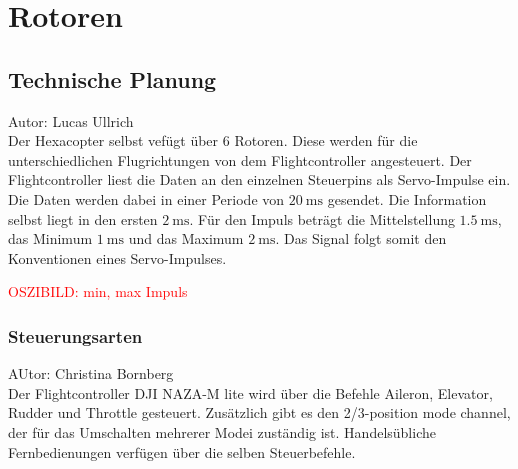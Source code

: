 \section{Rotoren}

  \subsection{Technische Planung}
  Autor: Lucas Ullrich\\
  Der Hexacopter selbst vefügt über 6 Rotoren. Diese werden für die unterschiedlichen Flugrichtungen von dem Flightcontroller angesteuert.
  Der Flightcontroller liest die Daten an den einzelnen Steuerpins als Servo-Impulse ein. Die Daten werden dabei in einer Periode von $\SI{20}{\milli\second}$ gesendet.
  Die Information selbst liegt in den ersten $\SI{2}{\milli\second}$. Für den Impuls beträgt die Mittelstellung $\SI{1.5}{\milli\second}$, das Minimum $\SI{1}{\milli\second}$
  und das Maximum $\SI{2}{\milli\second}$. Das Signal folgt somit den Konventionen eines Servo-Impulses.

  \textcolor{red}{OSZIBILD: min, max Impuls}


    \subsubsection{Steuerungsarten}
    AUtor: Christina Bornberg\\
    Der Flightcontroller DJI NAZA-M lite wird über die Befehle Aileron, Elevator, Rudder und Throttle gesteuert. Zusätzlich gibt es den 2/3-position mode channel, der für das Umschalten mehrerer Modei zuständig ist. Handelsübliche Fernbedienungen verfügen über die selben Steuerbefehle. \cite{GrundlagenMulticopter}

